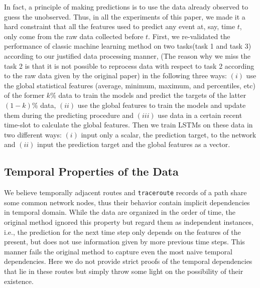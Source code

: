 \documentclass[sigconf]{acmart}
\begin{document}
	In fact, a principle of making predictions is to use the data already observed to guess the unobserved. Thus, in all the experiments of this paper, we made it a hard constraint that all the features used to predict any event at, say, time $t$, only come from the raw data collected before $t$. First, we re-validated the performance of classic machine learning method on two tasks(task 1 and task 3) according to our justified data processing manner, (The reason why we miss the task 2 is that it is not possible to reprocess data with respect to task 2 according to the raw data given by the original paper) in the following three ways: $(i)$ use the global statistical features (average, minimum, maximum, and percentiles, etc) of the former $k\%$ data to train the models and predict the targets of the latter $(1-k)\%$ data, $(ii)$ use the global features to train the models and update them during the predicting procedure and $(iii)$ use data in a certain recent time-slot to calculate the global features. Then we train LSTMs on these data in two different ways: $(i)$ input only a scalar, the prediction target, to the network and $(ii)$ input the prediction target and the global features as a vector.
	
	\subsection{Temporal Properties of the Data}
	We believe temporally adjacent routes and \texttt{traceroute} records of a path share some common network nodes, thus their behavior contain implicit dependencies in temporal domain. While the data are organized in the order of time, the original method ignored this property but regard them as independent instances, i.e., the prediction for the next time step only depends on the features of the present, but does not use information given by more previous time steps. This manner fails the original method to capture even the most naive temporal dependencies. Here we do not provide strict proofs of the temporal dependencies that lie in these routes but simply throw some light on the possibility of their existence.
	
\end{document}

